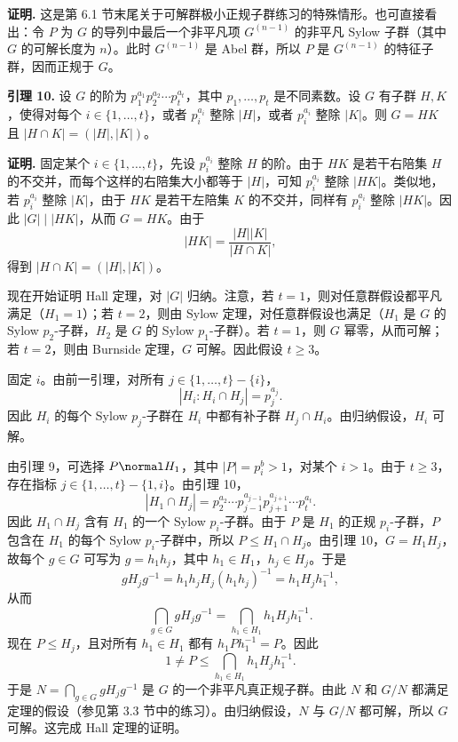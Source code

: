 \noindent\textbf{证明.} 这是第 6.1 节末尾关于可解群极小正规子群练习的特殊情形。也可直接看出：令 $P$ 为 $G$ 的导列中最后一个非平凡项 $G^{(n-1)}$ 的非平凡 Sylow 子群（其中 $G$ 的可解长度为 $n$）。此时 $G^{(n-1)}$ 是 Abel 群，所以 $P$ 是 $G^{(n-1)}$ 的特征子群，因而正规于 $G$。

\noindent\textbf{引理 10.} 设 $G$ 的阶为 $p_1^{a_1}p_2^{a_2}\cdots p_t^{a_t}$，其中 $p_1,\ldots,p_t$ 是不同素数。设 $G$ 有子群 $H,K$，使得对每个 $i\in\{1,\ldots,t\}$，或者 $p_i^{a_i}$ 整除 $|H|$，或者 $p_i^{a_i}$ 整除 $|K|$。则 $G=HK$ 且 $|H\cap K|=(|H|,|K|)$。

\noindent\textbf{证明.} 固定某个 $i\in\{1,\ldots,t\}$，先设 $p_i^{a_i}$ 整除 $H$ 的阶。由于 $HK$ 是若干右陪集 $H$ 的不交并，而每个这样的右陪集大小都等于 $|H|$，可知 $p_i^{a_i}$ 整除 $|HK|$。类似地，若 $p_i^{a_i}$ 整除 $|K|$，由于 $HK$ 是若干左陪集 $K$ 的不交并，同样有 $p_i^{a_i}$ 整除 $|HK|$。因此 $|G|\mid |HK|$，从而 $G=HK$。由于
\[
  |HK|=\frac{|H||K|}{|H\cap K|},
\]
得到 $|H\cap K|=(|H|,|K|)$。

现在开始证明 Hall 定理，对 $|G|$ 归纳。注意，若 $t=1$，则对任意群假设都平凡满足（$H_1=1$）；若 $t=2$，则由 Sylow 定理，对任意群假设也满足（$H_1$ 是 $G$ 的 Sylow $p_2$-子群，$H_2$ 是 $G$ 的 Sylow $p_1$-子群）。若 $t=1$，则 $G$ 幂零，从而可解；若 $t=2$，则由 Burnside 定理，$G$ 可解。因此假设 $t\geq3$。

固定 $i$。由前一引理，对所有 $j\in\{1,\ldots,t\}-\{i\}$，
\[
  |H_i:H_i\cap H_j|=p_j^{a_j}.
\]
因此 $H_i$ 的每个 Sylow $p_j$-子群在 $H_i$ 中都有补子群 $H_j\cap H_i$。由归纳假设，$H_i$ 可解。

由引理 9，可选择 $P\normal H_1$，其中 $|P|=p_i^b>1$，对某个 $i>1$。由于 $t\geq3$，存在指标 $j\in\{1,\ldots,t\}-\{1,i\}$。由引理 10，
\[
  |H_1\cap H_j|=p_2^{a_2}\cdots p_{j-1}^{a_{j-1}}p_{j+1}^{a_{j+1}}\cdots p_t^{a_t}.
\]
因此 $H_1\cap H_j$ 含有 $H_1$ 的一个 Sylow $p_i$-子群。由于 $P$ 是 $H_1$ 的正规 $p_i$-子群，$P$ 包含在 $H_1$ 的每个 Sylow $p_i$-子群中，所以 $P\leq H_1\cap H_j$。由引理 10，$G=H_1H_j$，故每个 $g\in G$ 可写为 $g=h_1h_j$，其中 $h_1\in H_1$，$h_j\in H_j$。于是
\[
  gH_jg^{-1}=h_1h_jH_j(h_1h_j)^{-1}=h_1H_jh_1^{-1},
\]
从而
\[
  \bigcap_{g\in G}gH_jg^{-1}=\bigcap_{h_1\in H_1}h_1H_jh_1^{-1}.
\]
现在 $P\leq H_j$，且对所有 $h_1\in H_1$ 都有 $h_1Ph_1^{-1}=P$。因此
\[
  1\neq P\leq \bigcap_{h_1\in H_1}h_1H_jh_1^{-1}.
\]
于是 $N=\bigcap_{g\in G}gH_jg^{-1}$ 是 $G$ 的一个非平凡真正规子群。由此 $N$ 和 $G/N$ 都满足定理的假设（参见第 3.3 节中的练习）。由归纳假设，$N$ 与 $G/N$ 都可解，所以 $G$ 可解。这完成 Hall 定理的证明。

